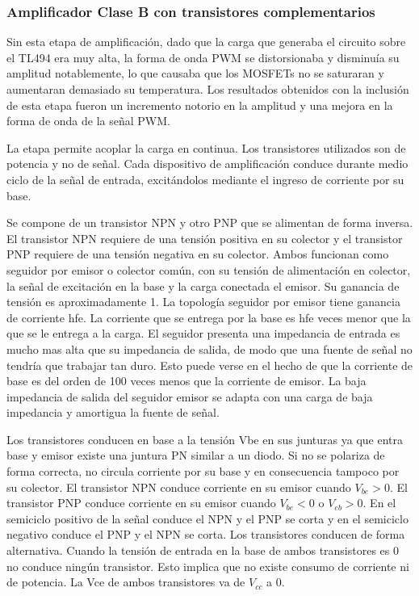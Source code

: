 
\subsubsection{Amplificador Clase B con transistores complementarios}

Sin esta etapa de amplificación, dado que la carga que generaba el circuito sobre el TL494 era muy alta, 
la forma de onda PWM se distorsionaba y disminuía su amplitud notablemente, lo que causaba que los MOSFETs no se saturaran y aumentaran demasiado su temperatura.
Los resultados obtenidos con la inclusión de esta etapa fueron un incremento notorio en la amplitud y una mejora en la forma de onda de la señal PWM.

La etapa permite acoplar la carga en continua. 
Los transistores utilizados son de potencia y no de señal. 
Cada dispositivo de amplificación conduce durante medio ciclo de la señal de entrada, 
excitándolos mediante el ingreso de corriente por su base.

Se compone de un transistor NPN y otro PNP que se alimentan de forma inversa.
El transistor NPN requiere de una tensión positiva en su colector y 
el transistor PNP requiere de una tensión negativa en su colector.
Ambos funcionan como seguidor por emisor o colector común, con su tensión de alimentación en colector, la señal de excitación en la base y la carga conectada el emisor. 
Su ganancia de tensión es aproximadamente 1. 
La topología seguidor por emisor tiene ganancia de corriente hfe. 
La corriente que se entrega por la base es hfe veces menor que la que se le entrega a la carga. 
El seguidor presenta una impedancia de entrada es mucho mas alta que su impedancia de salida, de modo que una fuente de señal no tendría que trabajar tan duro.
 Esto puede verse en el hecho de que la corriente de base es del orden de 100 veces menos que la corriente de emisor. 
 La baja impedancia de salida del seguidor emisor se adapta con una carga de baja impedancia y amortigua la fuente de señal.

Los transistores conducen en base a la tensión Vbe en sus junturas ya que entra base y emisor existe una juntura PN similar a un diodo. 
Si no se polariza de forma correcta, no circula corriente por su base y en consecuencia tampoco por su colector. 
El transistor NPN conduce corriente en su emisor cuando $V_{be}>0$. 
El transistor PNP conduce corriente en su emisor cuando $V_{be}<0$ o $V_{eb}>0$.
En el semiciclo positivo de la señal conduce el NPN y el PNP se corta y en el semiciclo negativo conduce el PNP y el NPN se corta. 
Los transistores conducen de forma alternativa. 
Cuando la tensión de entrada en la base de ambos transistores es 0 no conduce ningún transistor. 
Esto implica que no existe consumo de corriente ni de potencia. 
La Vce de ambos transistores va de $V_{cc}$ a 0.

